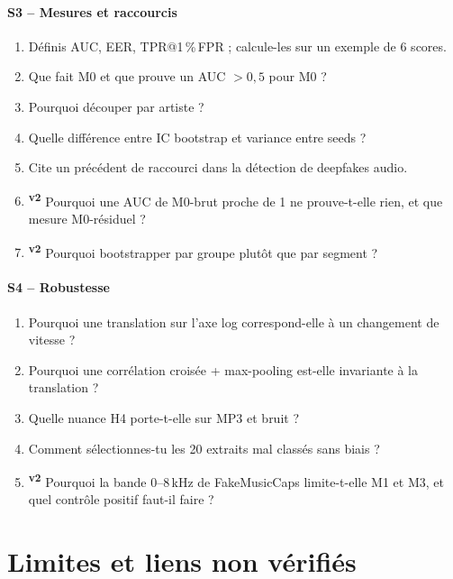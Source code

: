 \documentclass[11pt,a4paper]{article}
\newcommand{\vtwo}{\textsuperscript{\textcolor{orange!80!black}{\textbf{v2}}}}
\begin{document}
\paragraph{S3 -- Mesures et raccourcis}
\begin{enumerate}
\item Définis AUC, EER, TPR@1\,\%\,FPR ; calcule-les sur un exemple de 6 scores.
\item Que fait M0 et que prouve un AUC $>0{,}5$ pour M0 ?
\item Pourquoi découper par artiste ?
\item Quelle différence entre IC bootstrap et variance entre seeds ?
\item Cite un précédent de raccourci dans la détection de deepfakes audio.
\item \vtwo{} Pourquoi une AUC de M0-brut proche de 1 ne prouve-t-elle rien, et que mesure M0-résiduel ?
\item \vtwo{} Pourquoi bootstrapper par groupe plutôt que par segment ?
\end{enumerate}

\paragraph{S4 -- Robustesse}
\begin{enumerate}
\item Pourquoi une translation sur l'axe log correspond-elle à un changement de vitesse ?
\item Pourquoi une corrélation croisée + max-pooling est-elle invariante à la translation ?
\item Quelle nuance H4 porte-t-elle sur MP3 et bruit ?
\item Comment sélectionnes-tu les 20 extraits mal classés sans biais ?
\item \vtwo{} Pourquoi la bande 0--8\,kHz de FakeMusicCaps limite-t-elle M1 et M3, et quel contrôle positif faut-il faire ?
\end{enumerate}

\section{Limites et liens non vérifiés}\label{sec:limites}
\end{document}
